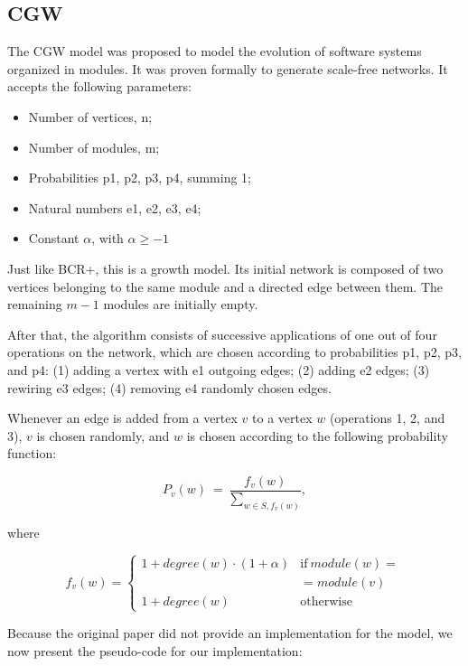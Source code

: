 \subsection{CGW}

The CGW model \cite{Chen2008} was proposed to model the evolution of software
systems organized in modules. It was proven formally to generate scale-free
networks.  It accepts the following parameters:

\begin{itemize}
\item Number of vertices, n;
\item Number of modules, m;
\item Probabilities p1, p2, p3, p4, summing 1;
\item Natural numbers e1, e2, e3, e4;
\item Constant $\alpha$, with $\alpha \ge -1$
\end{itemize}

Just like BCR+, this is a growth model. Its initial network is composed of two
vertices belonging to the same module and a directed edge between them. The
remaining $m - 1$ modules are initially empty. 

After that, the algorithm consists of successive applications of one out of four
operations on the network, which are chosen according to probabilities p1, p2,
p3, and p4: 
(1) adding a vertex with e1 outgoing edges; 
(2) adding e2 edges;
(3) rewiring e3 edges;
(4) removing e4 randomly chosen edges.

Whenever an edge is added from a vertex $v$ to a vertex $w$ (operations 1, 2,
and 3), $v$ is chosen randomly, and $w$ is chosen according to the following
probability function:

$$
  P_v(w) ~=~ \frac{ f_v(w) }{ \sum_{w \in S, f_v(w)} },
$$

where

$$
f_v(w) = \left\{
\begin{array}{ll}

1 + degree(w) \cdot (1 + \alpha) &  \mathrm{if}\ module(w) = \\%
                                 &  = module(v) \\
1 + degree(w) & \mathrm{otherwise}
\end{array}
\right.
$$

Because the original paper did not provide an implementation for the model, we
now present the pseudo-code for our implementation:

